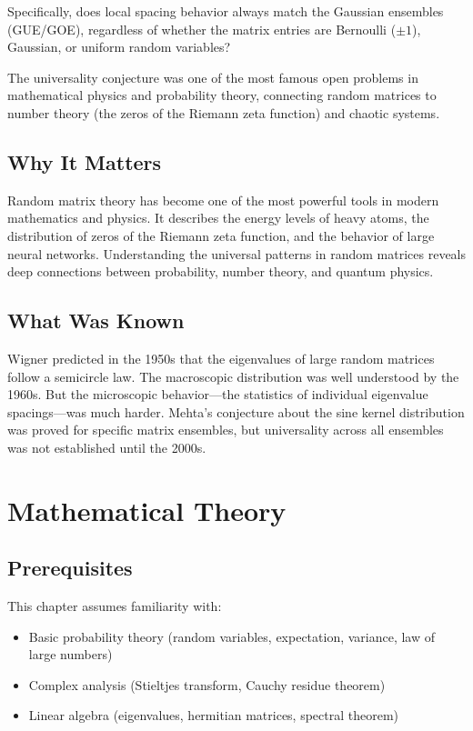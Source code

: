 Specifically, does local spacing behavior always match the Gaussian ensembles (GUE/GOE), regardless of whether the matrix entries are Bernoulli ($\pm 1$), Gaussian, or uniform random variables?

\begin{historicalbox}
The universality conjecture was one of the most famous open problems in mathematical physics and probability theory, connecting random matrices to number theory (the zeros of the Riemann zeta function) and chaotic systems.
\end{historicalbox}

\subsection{Why It Matters}
Random matrix theory has become one of the most powerful tools in modern mathematics and physics. It describes the energy levels of heavy atoms, the distribution of zeros of the Riemann zeta function, and the behavior of large neural networks. Understanding the universal patterns in random matrices reveals deep connections between probability, number theory, and quantum physics.

\subsection{What Was Known}
Wigner predicted in the 1950s that the eigenvalues of large random matrices follow a semicircle law. The macroscopic distribution was well understood by the 1960s. But the microscopic behavior---the statistics of individual eigenvalue spacings---was much harder. Mehta's conjecture about the sine kernel distribution was proved for specific matrix ensembles, but universality across all ensembles was not established until the 2000s.

\section{Mathematical Theory}


\subsection{Prerequisites}
This chapter assumes familiarity with:
\begin{itemize}
\item Basic probability theory (random variables, expectation, variance, law of large numbers)
\item Complex analysis (Stieltjes transform, Cauchy residue theorem)
\item Linear algebra (eigenvalues, hermitian matrices, spectral theorem)
\end{itemize}

